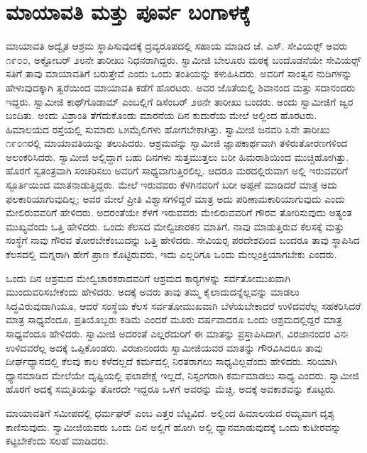 
\chapter{ಮಾಯಾವತಿ ಮತ್ತು ಪೂರ್ವ ಬಂಗಾಳಕ್ಕೆ }

 ಮಾಯಾವತಿ ಅದ್ವೈತ ಆಶ್ರಮ ಸ್ಥಾಪಿಸುವುದಕ್ಕೆ ದ್ರವ್ಯರೂಪದಲ್ಲಿ ಸಹಾಯ ಮಾಡಿದ ಜೆ. ಎಸ್. ಸೇವಿಯರ್ಸ್‍‍ ಅವರು ೧೯೦೦, ಅಕ್ಟೋಬರ್ ೨೮ನೇ ತಾರೀಖು ನಿಧನರಾಗಿದ್ದರು. ಸ್ವಾಮೀಜಿ ಬೇಲೂರು ಮಠಕ್ಕೆ ಬಂದೊಡನೆಯೇ ಸೇವಿಯರ್ಸ್‍‍ ಸತಿಗೆ ತಾವು ಮಾಯಾವತಿಗೆ ಬರುತ್ತೇವೆ ಎಂದು ಒಂದು ತಂತಿಯನ್ನು ಕಳುಹಿಸಿದರು. ಅವರಿಗೆ ಸಾಂತ್ವನ ನುಡಿಗಳನ್ನು ಹೇಳುವುದಕ್ಕಾಗಿ ತ್ವರೆಯಿಂದ ಮಾಯಾವತಿ ಕಡೆಗೆ ಹೊರಟರು. ಅವರ ಜೊತೆಯಲ್ಲಿ ಶಿವಾನಂದ ಮತ್ತು ಸದಾನಂದರು ಇದ್ದರು. ಸ್ವಾಮೀಜಿ ಕಾಥ್‍ಗೊಡಾಮ್ ಎಂಬಲ್ಲಿಗೆ ಡಿಸೆಂಬರ್ ೨೮ನೇ ತಾರೀಖು ಬಂದರು. ಅಂದು ಸ್ವಾಮೀಜಿಗೆ ಜ್ವರ ಬಂದಿತು. ಅಂದು ವಿಶ್ರಾಂತಿ ತೆಗೆದುಕೊಂಡು ಮಾರನೆಯ ದಿನ ಕುದುರೆಯ ಮೇಲೆ ಅಲ್ಲಿಂದ ಹೊರಟರು. ಹಿಮಾಲಯದ ರಸ್ತೆಯಲ್ಲಿ ಸುಮಾರು ೬೫ಮೈಲಿಗಳು ಹೋಗಬೇಕಾಗಿತ್ತು. ಸ್ವಾಮೀಜಿ ಜನವರಿ ೩ನೇ ತಾರೀಖು ೧೯೦೧ರಲ್ಲಿ ಮಾಯಾವತಿಯನ್ನು ತಲುಪಿದರು. ಆಶ್ರಮವನ್ನು ಸ್ವಾಮೀಜಿ ಜ್ಞಾಪಕಾರ್ಥವಾಗಿ ತಳಿರುತೋರಣಗಳಿಂದ ಅಲಂಕರಿಸಿದರು. ಸ್ವಾಮೀಜಿ ಅಲ್ಲಿದ್ದಾಗ ಬಹು ದಿನಗಳು ಸುತ್ತಮುತ್ತಲು ಬರೀ ಹಿಮರಾಶಿಯಿಂದ ಮುಚ್ಚಿಹೋಗಿತ್ತು. ಹೊರಗೆ ಸ್ವತಂತ್ರವಾಗಿ ಸಂಚರಿಸಲು ಅವರಿಗೆ ಸಾಧ್ಯವಾಗುತ್ತಿರಲಿಲ್ಲ. ಆದರೂ ಮಠದಲ್ಲಿರುವಾಗ ಅಲ್ಲಿ ಇರುವವರಿಗೆ ಸ್ಫೂರ್ತಿಯಿಂದ ಮಾತನಾಡುತ್ತಿದ್ದರು. ಮೇಲೆ ಇರುವವರು ಕೆಳಗಿನವರಿಗೆ ಬರೀ ಅಪ್ಪಣೆ ಮಾಡಿದರೆ ಮಾತ್ರ ಅದು ಫಲಕಾರಿಯಾಗುವುದಿಲ್ಲ; ಅವರ ಮೇಲೆ ಪ್ರೀತಿ ವಿಶ್ವಾಸಗಳಿದ್ದರೆ ಮಾತ್ರ ಅದು ಪರಿಣಾಮಕಾರಿಯಾಗುವುದು ಎಂದು ಮೇಲಿರುವವರಿಗೆ ಹೇಳಿದರು. ಅದರಂತೆಯೇ ಕೆಳಗೆ ಇರುವವರು ಮೇಲಿರುವವರಿಗೆ ಗೌರವ ತೋರಿಸುವುದು ಅತ್ಯಂತ ಮುಖ್ಯವೆಂದು ಒತ್ತಿ ಹೇಳಿದರು. ಒಂದು ಕೆಲಸದ ಮೇಲ್ವಿಚಾರಕನ ಮಾತಿಗೆ, ನಾವು ಮಾಡುತ್ತಿರುವ ಕೆಲಸಕ್ಕೆ ಮತ್ತು ಸಂಸ್ಥೆಗೆ ನಾವು ಗೌರವ ತೋರಬೇಕೆಂಬುದನ್ನು ಒತ್ತಿ ಹೇಳಿದರು. ಸೇವಿಯರ‍್ಸ ಪರದೇಶದಿಂದ ಬಂದರೂ ತಾವು ಸ್ಥಾಪಿಸಿದ ಕೆಲಸದಲ್ಲಿ ಮಗ್ನರಾಗಿ ಹೇಗೆ ಪ್ರಾಣ ಕೊಟ್ಟಿರುವರು, ಇದು ಎಲ್ಲರಿಗೂ ಒಂದು ಮೇಲ್ಪಂಕ್ತಿಯಾಗಬೇಕು ಎಂದರು. 

 ಒಂದು ದಿನ ಆಶ್ರಮದ ಮೇಲ್ವಿಚಾರಕರಾದವರಿಗೆ ಆಶ್ರಮದ ಕಾರ‍್ಯ‍ಗಳನ್ನು ಸರ್ವತೋಮುಖವಾಗಿ ಮುಂದುವರಿಸಬೇಕೆಂದು ಹೇಳಿದರು. ಅದಕ್ಕೆ ಅವರು ತಾವು ತಮ್ಮ ಕೈಲಾದುದನ್ನೆಲ್ಲವನ್ನು ಮಾಡಲು ಸಿದ್ಧವಿರುವುದಾಗಿಯೂ, ಆದರೆ ಸಂಸ್ಥೆಯ ಕೆಲಸ ಸರ್ವತೋಮುಖವಾಗಿ ಬೆಳೆಯಬೇಕಾದರೆ ಉಳಿದವರೆಲ್ಲ ಸಹಕರಿಸಿದರೆ ಮಾತ್ರ ಸಾಧ್ಯವೆಂದೂ, ಪ್ರತಿಯೊಬ್ಬರು ಕಡಿಮೆ ಎಂದರೆ ಮೂರು ವರ್ಷವಾದರೂ ಒಂದು ಆಶ್ರಮದಲ್ಲಿದ್ದರೆ ಮಾತ್ರ ಸಾಧ್ಯವೆಂದೂ ಹೇಳಿದರು. ಸ್ವಾಮೀಜಿ ಅದರಂತೆ ಎಲ್ಲರೆದುರಿಗೆ ಈ ಮಾತನ್ನು ಪ್ರಸ್ತಾಪಿಸಿದಾಗ, ವಿರಜಾನಂದರ ವಿನಃ ಉಳಿದವರೆಲ್ಲ ಅದಕ್ಕೆ ಒಪ್ಪಿಕೊಂಡರು. ವಿರಜಾನಂದರು ಸ್ವಾಮೀಜಿಯವರ ಮಾತನ್ನು ಗೌರವಿಸಿದರೂ ತಾವು ದೀರ್ಘಧ್ಯಾನದಲ್ಲಿ ಕೆಲವು ಕಾಲ ಕಳೆದಲ್ಲದೆ ಕರ್ಮದಲ್ಲಿ ನಿರತರಾಗಲು ಸಾಧ್ಯವಿಲ್ಲವೆಂದು ಹೇಳಿದರು. ಸರಿಯಾಗಿ ಧ್ಯಾನಮಾಡಿದ ಮೇಲೆಯೇ ದೃಷ್ಟಿಯಲ್ಲಿ ಫಲಾಪೇಕ್ಷೆ ಇಲ್ಲದೆ, ನಿಸ್ಸಂಗರಾಗಿ ಕರ್ಮಮಾಡಲು ಸಾಧ್ಯ ಎಂದರು. ಸ್ವಾಮೀಜಿ ಹೊರಗೆ ಅದಕ್ಕೆ ಸಮ್ಮತಿಯನ್ನು ತೋರದೇ ಇದ್ದರೂ ಒಳಗೆ ಅವರನ್ನು ಮೆಚ್ಚಿ, ಅದಕ್ಕೆ ಅವಕಾಶವನ್ನು ಕೊಟ್ಟರು. 

 ಮಾಯಾವತಿಗೆ ಸಮೀಪದಲ್ಲಿ ಧರ್ಮಘರ್ ಎಂಬ ಎತ್ತರ ಬೆಟ್ಟವಿದೆ. ಅಲ್ಲಿಂದ ಹಿಮಾಲಯದ ರಮ್ಯವಾಗ ದೃಶ್ಯ ಕಾಣಿಸುವುದು. ಸ್ವಾಮೀಜಿಯವರು ಒಂದು ದಿನ ಅಲ್ಲಿಗೆ ಹೋಗಿ ಅಲ್ಲಿ ಧ್ಯಾನಮಾಡುವುದಕ್ಕೆ ಒಂದು ಕುಟೀರವನ್ನು ಕಟ್ಟಬೇಕೆಂದು ಸಲಹೆ ಮಾಡಿದರು. 

